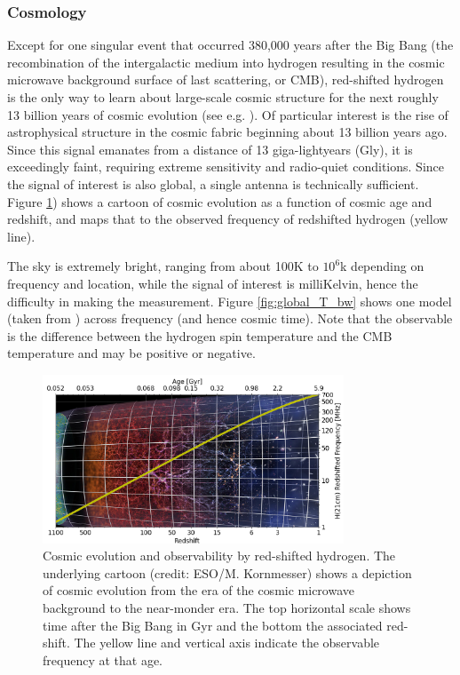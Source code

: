 \subsubsection{Cosmology}
Except for one singular event that occurred 380,000 years after the Big Bang (the recombination of the intergalactic medium into hydrogen resulting in the cosmic microwave background surface of last scattering, or CMB), red-shifted hydrogen is the only way to learn about large-scale cosmic structure for the next roughly 13 billion years of cosmic evolution (see e.g. \citealt{Fialkov_2024}).  Of particular interest is the rise of astrophysical structure in the cosmic fabric beginning about 13 billion years ago.  Since this signal emanates from a distance of 13 giga-lightyears (Gly), it is exceedingly faint, requiring extreme sensitivity and radio-quiet conditions.  Since the signal of interest is also global, a single antenna is technically sufficient.  Figure \ref{fig:cosmo_h}) shows a cartoon of cosmic evolution as a function of cosmic age and redshift, and maps that to the observed frequency of redshifted hydrogen (yellow line).

The sky is extremely bright, ranging from about 100K to $10^6$k depending on frequency and location, while the signal of interest is milliKelvin, hence the difficulty in making the measurement.  Figure \ref{fig:global_T_bw} shows one model (taken from \citealt{Fialkov_2024}) across frequency (and hence cosmic time).  Note that the observable is the difference between the hydrogen spin temperature and the CMB temperature and may be positive or negative.

\begin{figure}[h]
    \centering
    \includegraphics[width=0.8\textwidth]{figures/zage_lft3_python.png}
    \caption{Cosmic evolution and observability by red-shifted hydrogen.  The underlying cartoon (credit: ESO/M. Kornmesser) shows a depiction of cosmic evolution from the era of the cosmic microwave background to the near-monder era.  The top horizontal scale shows time after the Big Bang in Gyr and the bottom the associated red-shift.  The yellow line and vertical axis indicate the observable frequency at that age.}
    \label{fig:cosmo_h}
\end{figure}

